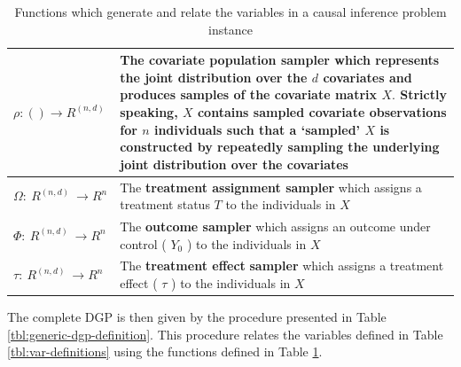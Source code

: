 \documentclass[../main.tex]{subfiles}
\begin{document}
\begin{table}[H]
\begin{tabular}{|p{1.25in}|p{3.75in}|}
\hline

$\rho :  \left(  \right)   \rightarrow R^{ \left( n, d \right) }$ & The \textbf{covariate population sampler} which represents the joint distribution over the  \( d \)  covariates and produces samples of the covariate matrix  \( X. \) Strictly speaking,  \( X \) contains sampled covariate observations for  \( n \) individuals such that a ‘sampled’  \( X \) is constructed by repeatedly sampling the underlying joint distribution over the covariates \\ \hline

$ \Omega :~R^{ \left( n, d \right) }~ \rightarrow R^{n}$ & The \textbf{treatment assignment sampler} which assigns a treatment status  \( T \) to the individuals in  \( X \)  \\ \hline

$\Phi :~R^{ \left( n, d \right) }~ \rightarrow R^{n}$ & The \textbf{outcome sampler} which assigns an outcome under control ( \( Y_{0} \) ) to the individuals in  \( X \) \\ \hline

$ \tau:~R^{ \left( n, d \right) }~ \rightarrow R^{n}$ & The \textbf{treatment effect} \textbf{sampler} which assigns a treatment effect ( \(  \tau \) ) to the individuals in  \( X \) \\ \hline

\end{tabular}

\caption{Functions which generate and relate the variables in a causal inference problem instance}
\label{tbl:func-definitions}
\end{table}

\vspace{\baselineskip}

The complete DGP is then given by the procedure presented in Table \ref{tbl:generic-dgp-definition}. This procedure relates the variables defined in Table \ref{tbl:var-definitions} using the functions defined in Table \ref{tbl:func-definitions}.
\end{document}
